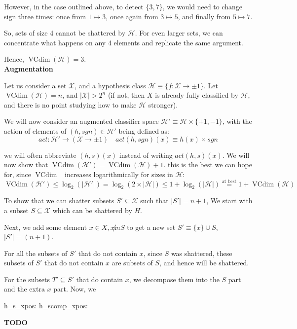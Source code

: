 \documentclass[11pt]{article}
\renewcommand{\H}{\ensuremath{\mathcal{H}}}
\newcommand{\X}{\ensuremath{\mathcal{X}}}
\DeclareMathOperator{\vcdim}{VCdim}
\newcommand{\vc}{\ensuremath{\vcdim}}
\begin{document}
However, in the case outlined above, to detect $\{3, 7\}$,
we would need to change sign three times:
once from $1 \mapsto 3$, once again from $3 \mapsto 5$, and finally from $5 \mapsto 7$.

So, sets of size 4 cannot be shattered by $\H$. For even larger sets, we can concentrate
what happens on any 4 elements and replicate the same argument.

Hence, $\vc(\H) = 3$.
\\
\textbf{Augmentation}

Let us consider a set $\X$, and a hypothesis class $\H \equiv \{ f : \X \rightarrow \pm 1 \}$. Let $\vc(\H) = n$, and
$|\X| > 2^{n}$ (if not, then $X$ is already fully classified by $\H$, and there
is no point studying how to make $\H$ stronger).

We will now consider an augmented classifier space $\H' \equiv \H \times \{+1, -1\}$,
with the action of elements of $(h, sgn) \in \H'$ being defined as:
$$
act: \H' \rightarrow (\X \rightarrow \pm 1) \quad
act(h, sgn)(x) \equiv h(x) \times sgn
$$

we will often abbreviate $(h, s)(x)$ instead of writing $act(h, s)(x)$. We will
now show that $\vc(\H') = \vc(\H) + 1$. this is the best we can hope for,
since \vc~ increases logarithmically for sizes in $\H$:
$$
\vc(\H') \leq \log_2(|\H'|) = \log_2(2 \times |\H|) \leq 1 + \log_2(|\H|) \overset{\text{at best}}{=} 1 + \vc(\H)
$$

To show that we can shatter subsets $S' \subseteq \X$ such that $|S'| = n + 1$, 
We start with a subset $S \subseteq \X$ which can be shattered by $H$.

Next, we add some element $x \in X, x \not in S$ to get a new set
$S' \equiv \{x \} \cup S$, $|S'| = (n +1)$.

For all the subsets of $S'$ that do not contain $x$, since $S$
was shattered, these subsets of $S'$ that do not contain $x$
are subsets of $S$, and hence will be shattered.

For the subsets $T' \subseteq S'$ that do contain $x$, we decompose
them into the $S$ part and the extra $x$ part. Now, we 

h_s_xpos:
h_scomp_xpos: 

\textbf{TODO}
\end{document}
